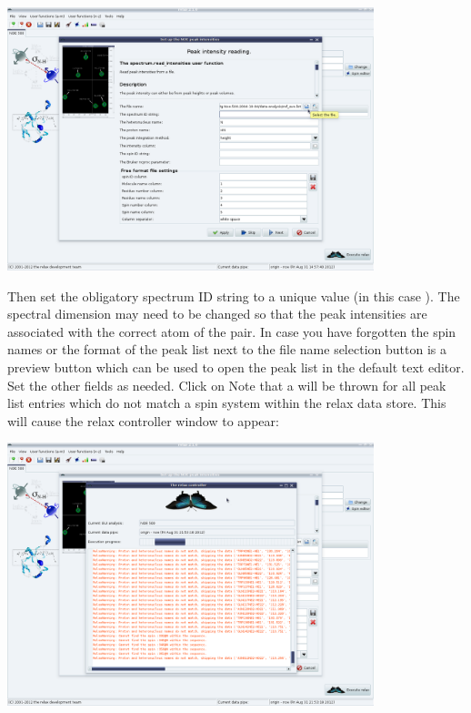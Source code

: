 \begin{minipage}[h]{\linewidth}
\centerline{\includegraphics[width=0.8\textwidth, bb=14 14 1415 1019]{graphics/screenshots/noe_analysis/peak_intensity1}}
\end{minipage}

Then set the obligatory spectrum ID string to a unique value (in this case ).  The spectral dimension may need to be changed so that the peak intensities are associated with the correct atom of the pair.  In case you have forgotten the spin names or the format of the peak list next to the file name selection button is a preview button which can be used to open the peak list in the default text editor.  Set the other fields as needed.
Click on 
Note that a  will be thrown for all peak list entries which do not match a spin system within the relax data store.  This will cause the relax controller window to appear:

\begin{minipage}[h]{\linewidth}
\centerline{\includegraphics[width=0.8\textwidth, bb=14 14 1415 1019]{graphics/screenshots/noe_analysis/peak_intensity2}}
\end{minipage}

